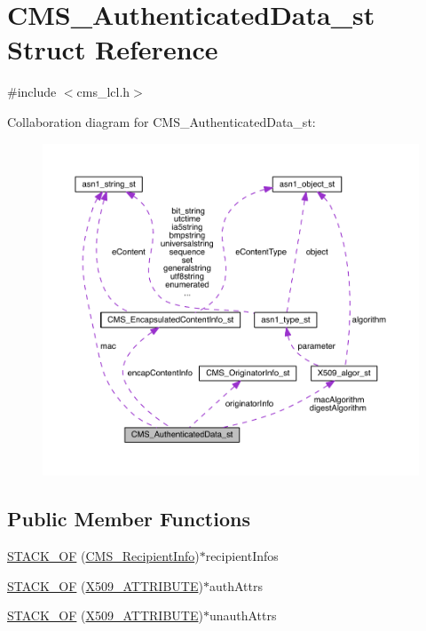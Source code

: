 \hypertarget{struct_c_m_s___authenticated_data__st}{}\section{C\+M\+S\+\_\+\+Authenticated\+Data\+\_\+st Struct Reference}
\label{struct_c_m_s___authenticated_data__st}


{\ttfamily \#include $<$cms\+\_\+lcl.\+h$>$}



Collaboration diagram for C\+M\+S\+\_\+\+Authenticated\+Data\+\_\+st\+:\nopagebreak
\begin{figure}[H]
\begin{center}
\leavevmode
\includegraphics[width=350pt]{struct_c_m_s___authenticated_data__st__coll__graph}
\end{center}
\end{figure}
\subsection*{Public Member Functions}
\begin{DoxyCompactItemize}
\item 
\hyperlink{struct_c_m_s___authenticated_data__st_a8119f9ab1b20c31bc1dbb8365f0325eb}{S\+T\+A\+C\+K\+\_\+\+OF} (\hyperlink{crypto_2cms_2cms_8h_ac5c9066f9d23a39dc973dd8821304756}{C\+M\+S\+\_\+\+Recipient\+Info})$\ast$recipient\+Infos
\item 
\hyperlink{struct_c_m_s___authenticated_data__st_a855d9c25f7a23c64233c1ba98f7ea3a5}{S\+T\+A\+C\+K\+\_\+\+OF} (\hyperlink{crypto_2x509_2x509_8h_aa4f1a62a9d2dd8cb6780fe2713737c0f}{X509\+\_\+\+A\+T\+T\+R\+I\+B\+U\+TE})$\ast$auth\+Attrs
\item 
\hyperlink{struct_c_m_s___authenticated_data__st_a9be6bb10ea4d9c7db8bf42034be0829c}{S\+T\+A\+C\+K\+\_\+\+OF} (\hyperlink{crypto_2x509_2x509_8h_aa4f1a62a9d2dd8cb6780fe2713737c0f}{X509\+\_\+\+A\+T\+T\+R\+I\+B\+U\+TE})$\ast$unauth\+Attrs
\end{DoxyCompactItemize}
